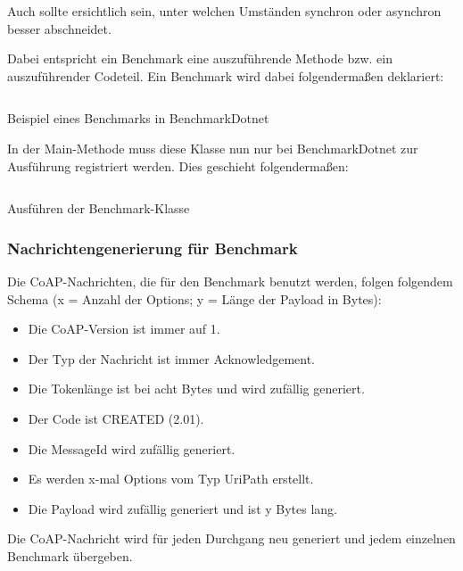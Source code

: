 Auch sollte ersichtlich sein, unter welchen Umständen synchron oder asynchron besser abschneidet.

Dabei entspricht ein Benchmark eine auszuführende Methode bzw. ein auszuführender Codeteil. Ein Benchmark wird dabei folgendermaßen deklariert:

\begin{listing}[H]
    \inputminted[framesep=2mm, baselinestretch=1.2, fontsize=\normalsize, linenos]{csharp}{codes/benchmark_example.cs}
    \caption{Beispiel eines Benchmarks in BenchmarkDotnet}
    \label{listing:beispiel-eines-benchmarks-in-benchmarkdotnet}
\end{listing}

In der Main-Methode muss diese Klasse nun nur bei BenchmarkDotnet zur Ausführung registriert werden. Dies geschieht folgendermaßen:

\begin{listing}[H]
    \inputminted[framesep=2mm, baselinestretch=1.2, fontsize=\normalsize, linenos]{csharp}{codes/execution_of_benchmark.cs}
    \caption{Ausführen der Benchmark-Klasse}
    \label{listing:ausfuehren-der-benchmark-klasse}
\end{listing}

\subsubsection{Nachrichtengenerierung für Benchmark}
\label{subsubsec:nachrichtengenerierung-fuer-benchmark}

Die CoAP-Nachrichten, die für den Benchmark benutzt werden, folgen folgendem Schema (x = Anzahl der Options; y = Länge der Payload in Bytes):
\begin{itemize}
    \item Die CoAP-Version ist immer auf 1.
    \item Der Typ der Nachricht ist immer Acknowledgement.
    \item Die Tokenlänge ist bei acht Bytes und wird zufällig generiert.
    \item Der Code ist CREATED (2.01).
    \item Die MessageId wird zufällig generiert.
    \item Es werden x-mal Options vom Typ UriPath erstellt.
    \item Die Payload wird zufällig generiert und ist y Bytes lang.
\end{itemize}

Die CoAP-Nachricht wird für jeden Durchgang neu generiert und jedem einzelnen Benchmark übergeben.

